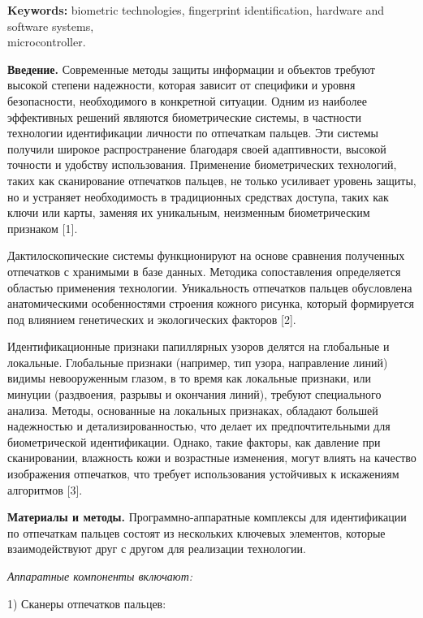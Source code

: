 {\bfseries Keywords:} biometric technologies, fingerprint identification,
hardware and software systems, \\microcontroller.

\begin{multicols}{2}
{\bfseries Введение.} Современные методы защиты информации и объектов
требуют высокой степени надежности, которая зависит от специфики и
уровня безопасности, необходимого в конкретной ситуации. Одним из
наиболее эффективных решений являются биометрические системы, в
частности технологии идентификации личности по отпечаткам пальцев. Эти
системы получили широкое распространение благодаря своей адаптивности,
высокой точности и удобству использования. Применение биометрических
технологий, таких как сканирование отпечатков пальцев, не только
усиливает уровень защиты, но и устраняет необходимость в традиционных
средствах доступа, таких как ключи или карты, заменяя их уникальным,
неизменным биометрическим признаком {[}1{]}.

Дактилоскопические системы функционируют на основе сравнения полученных
отпечатков с хранимыми в базе данных. Методика сопоставления
определяется областью применения технологии. Уникальность отпечатков
пальцев обусловлена анатомическими особенностями строения кожного
рисунка, который формируется под влиянием генетических и экологических
факторов {[}2{]}.

Идентификационные признаки папиллярных узоров делятся на глобальные и
локальные. Глобальные признаки (например, тип узора, направление линий)
видимы невооруженным глазом, в то время как локальные признаки, или
минуции (раздвоения, разрывы и окончания линий), требуют специального
анализа. Методы, основанные на локальных признаках, обладают большей
надежностью и детализированностью, что делает их предпочтительными для
биометрической идентификации. Однако, такие факторы, как давление при
сканировании, влажность кожи и возрастные изменения, могут влиять на
качество изображения отпечатков, что требует использования устойчивых к
искажениям алгоритмов {[}3{]}.

{\bfseries Материалы и методы.} Программно-аппаратные комплексы для
идентификации по отпечаткам пальцев состоят из нескольких ключевых
элементов, которые взаимодействуют друг с другом для реализации
технологии.

\emph{Аппаратные компоненты включают:}

1) Сканеры отпечатков пальцев:


\end{multicols}
